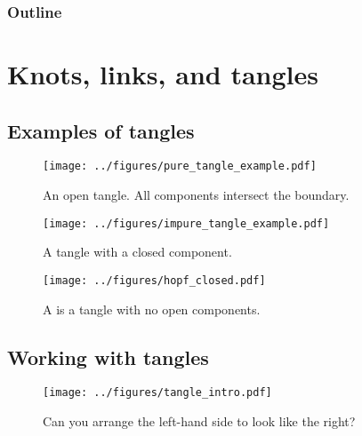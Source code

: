 \documentclass{beamer}
\title{\myTitle}
\author{\myName}
\date{\myTime}
\institute{\myUni~\\\myDepartment}
\theoremstyle{theorem}
\begin{document}
\begin{frame}
        \titlepage
\end{frame}

\begin{frame}
        \frametitle{Outline}
        \tableofcontents[hideallsubsections]
\end{frame}

\section{Knots, links, and tangles}

\subsection{Examples of tangles}

\begin{frame}
        \begin{figure}
                \centering
                \texttt{[image: ../figures/pure\_tangle\_example.pdf]}
                \caption{An open tangle. All components intersect the boundary.}
                \label{fig:open_tangle}
        \end{figure}
\end{frame}

\begin{frame}
        \begin{figure}
        \centering
        \texttt{[image: ../figures/impure\_tangle\_example.pdf]}
        \caption{A tangle with a closed component.}
        \label{fig:impure_tangle}
\end{figure}
\end{frame}

\begin{frame}
        \begin{figure}
                \centering
                \texttt{[image: ../figures/hopf\_closed.pdf]}
                \caption{A  is a tangle with no open components.}
                \label{fig:hopf_closed}
        \end{figure}
\end{frame}

\subsection{Working with tangles}

\begin{frame}
\begin{figure}
        \centering
        \texttt{[image: ../figures/tangle\_intro.pdf]}
        \caption{Can you arrange the left-hand side to look like the right?}
        \label{fig:tangle_intro}
\end{figure}
\end{frame}
\end{document}
